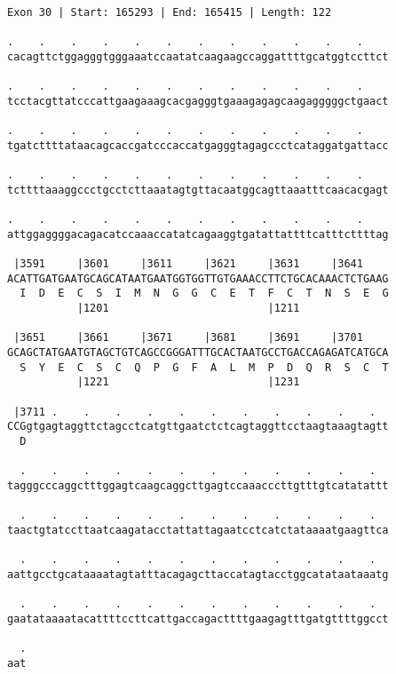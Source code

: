 \documentclass{article}
\begin{document}
\begin{Verbatim}[fontfamily=courier]
Exon 30 | Start: 165293 | End: 165415 | Length: 122

.    .    .    .    .    .    .    .    .    .    .    .    
cacagttctggagggtgggaaatccaatatcaagaagccaggattttgcatggtccttct

.    .    .    .    .    .    .    .    .    .    .    .    
tcctacgttatcccattgaagaaagcacgagggtgaaagagagcaagagggggctgaact

.    .    .    .    .    .    .    .    .    .    .    .    
tgatcttttataacagcaccgatcccaccatgagggtagagccctcataggatgattacc

.    .    .    .    .    .    .    .    .    .    .    .    
tcttttaaaggccctgcctcttaaatagtgttacaatggcagttaaatttcaacacgagt

.    .    .    .    .    .    .    .    .    .    .    .    
attggaggggacagacatccaaaccatatcagaaggtgatattattttcatttcttttag

 |3591     |3601     |3611     |3621     |3631     |3641    
ACATTGATGAATGCAGCATAATGAATGGTGGTTGTGAAACCTTCTGCACAAACTCTGAAG
  I  D  E  C  S  I  M  N  G  G  C  E  T  F  C  T  N  S  E  G
           |1201                         |1211              

 |3651     |3661     |3671     |3681     |3691     |3701    
GCAGCTATGAATGTAGCTGTCAGCCGGGATTTGCACTAATGCCTGACCAGAGATCATGCA
  S  Y  E  C  S  C  Q  P  G  F  A  L  M  P  D  Q  R  S  C  T
           |1221                         |1231              

 |3711 .    .    .    .    .    .    .    .    .    .    .  
CCGgtgagtaggttctagcctcatgttgaatctctcagtaggttcctaagtaaagtagtt
  D                                                         

  .    .    .    .    .    .    .    .    .    .    .    .  
tagggcccaggctttggagtcaagcaggcttgagtccaaacccttgtttgtcatatattt

  .    .    .    .    .    .    .    .    .    .    .    .  
taactgtatccttaatcaagatacctattattagaatcctcatctataaaatgaagttca

  .    .    .    .    .    .    .    .    .    .    .    .  
aattgcctgcataaaatagtatttacagagcttaccatagtacctggcatataataaatg

  .    .    .    .    .    .    .    .    .    .    .    .  
gaatataaaatacattttccttcattgaccagacttttgaagagtttgatgttttggcct

  .
aat
\end{Verbatim}
\newpage
\end{document}
